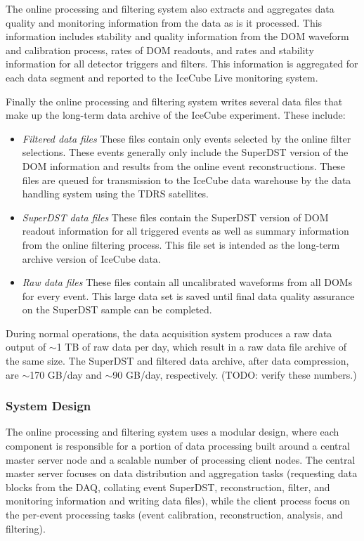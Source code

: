 The online processing and filtering system also extracts and aggregates data quality and monitoring information
from the data as is it processed.  This information includes stability and quality information from the
DOM waveform and calibration process, rates of DOM readouts, and rates and stability
information for all detector triggers and filters.  This information is aggregated for each data segment and
reported to the IceCube Live monitoring system.

Finally the online processing and filtering system writes several data files that make up the long-term data archive of the IceCube
experiment.  These include:
\begin{itemize}
\item \emph {Filtered data files} These files contain only events selected by the online filter selections.  These events
generally only include the SuperDST version of the DOM information and results from the online event reconstructions.  These
files are queued for transmission to the IceCube data warehouse by the data handling system using the TDRS satellites.
\item \emph {SuperDST data files} These files contain the SuperDST version of DOM readout information for all triggered events as well as summary
information from the online filtering process.  This file set is intended as the long-term archive version of IceCube data.
\item \emph {Raw data files}  These files contain all uncalibrated waveforms from all DOMs for every event.  This large data
set is saved until final data quality assurance on the SuperDST sample can be completed.
\end{itemize}

During normal operations, the data acquisition system produces a raw data output of $\sim$1 TB of raw data per day, which result in
a raw data file archive of the same size.  The SuperDST  and filtered data archive, after data compression, are $\sim$170 GB/day and $\sim$90 GB/day,
respectively.  (TODO: verify these numbers.)
\subsubsection{System Design}

The online processing and filtering system uses a modular design, where each component
is responsible for a portion of data processing built around a central master server node and a
scalable number of processing client nodes.  The central master server focuses on
data distribution and aggregation tasks (requesting data blocks from the DAQ, collating event SuperDST, reconstruction, filter,
and monitoring information and writing data files), while the client process focus on the per-event
processing tasks (event calibration, reconstruction, analysis, and filtering).  

